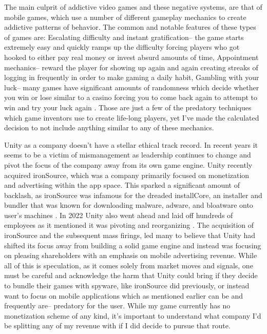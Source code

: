 \documentclass[10pt,twocolumn]{article}
\begin{document}
The main culprit of addictive video games and these negative systems, are that of mobile games, which use a number of different gameplay mechanics to create addictive patterns of behavior. The common and notable features of these types of games are: Escalating difficulty and instant gratification-- the game starts extremely easy and quickly ramps up the difficulty forcing players who got hooked to either pay real money or invest absurd amounts of time, Appointment mechanics-- reward the player for showing up again and again creating streaks of logging in frequently in order to make gaming a daily habit, Gambling with your luck-- many games have significant amounts of randomness which decide whether you win or lose similar to a casino forcing you to come back again to attempt to win and try your luck again \cite{AddictiveMobileGame}. Those are just a few of the predatory techniques which game inventors  use to create life-long players, yet I’ve made the calculated decision to not include anything similar to any of these mechanics.


Unity as a company doesn’t have a stellar ethical track record. In recent years it seems to be a victim of mismanagement as leadership continues to change and pivot the focus of the company away from its own game engine. Unity recently acquired ironSource, which was a company primarily focused on monetization and advertising within the app space. This sparked a significant amount of backlash, as ironSource was infamous for the dreaded installCore, an installer and bundler that was known for downloading malware, adware, and bloatware onto user’s machines \cite{MalwareBytesInstallCore}. In 2022 Unity also went ahead and laid off hundreds of employees as it mentioned it was pivoting and reorganizing \cite{UnityLayoffs}. The acquisition of ironSource and the subsequent mass firings, led many to believe that Unity had shifted its focus away from building a solid game engine and instead was focusing on pleasing shareholders with an emphasis on mobile advertising revenue. While all of this is speculation, as it comes solely from market moves and signals, one must be careful and acknowledge the harm that Unity could bring if they decide to bundle their games with spyware, like ironSource did previously, or instead want to focus on mobile applications which as mentioned earlier can be and frequently are-- predatory for the user. While my game currently has no monetization scheme of any kind, it’s important to understand what company I’d be splitting any of my revenue with if I did decide to pursue that route. 



\printbibliography 
\end{document}
